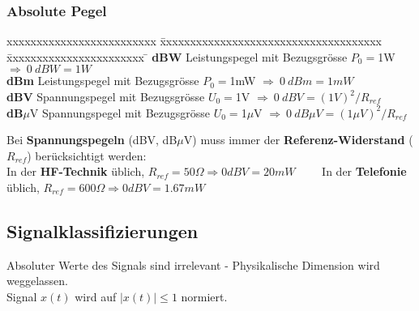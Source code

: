 \subsubsection{Absolute Pegel}
	\begin{tabbing}
	xxxxxxxxxxxxxxxxxxxxxxxxx \= xxxxxxxxxxxxxxxxxxxxxxxxxxxxxxxxxxxxx  \= xxxxxxxxxxxxxxxxxxxxxxx \=\kill
	\textbf{dBW} \> Leistungspegel mit Bezugsgrösse $P_0 = $1W \> $\Longrightarrow \: 0 \: dBW = 1W$\\
	\textbf{dBm} \> Leistungspegel mit Bezugsgrösse $P_0 = $1mW \> $\Longrightarrow \: 0 \: dBm = 1mW$\\
	\textbf{dBV} \> Spannungspegel mit Bezugsgrösse $U_0 = $1V \> $\Longrightarrow \: 0 \: dBV = (1V)^2/R_{ref}$\\
	\textbf{dB}$\mu$V \> Spannungspegel mit Bezugsgrösse $U_0 = $1$\mu$V \> $\Longrightarrow \: 0 \: dB \mu V = (1 \mu V)^2/R_{ref}$
	\end{tabbing}
Bei \textbf{Spannungspegeln} (dBV, dB$\mu$V) muss immer der \textbf{Referenz-Widerstand} ($R_{ref}$) berücksichtigt werden: \\
In der \textbf{HF-Technik} üblich, $R_{ref} = 50 \Omega \Rightarrow 0 dBV = 20 mW \qquad $
In der \textbf{Telefonie} üblich, $R_{ref} = 600  \Omega \Rightarrow 0 dBV =
1.67 mW$ 

\subsection{Signalklassifizierungen}
Absoluter Werte des Signals sind irrelevant - Physikalische Dimension wird weggelassen. \\
Signal $x(t)$ wird auf $|x(t)| \leq 1$ normiert.

